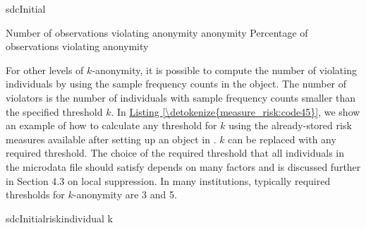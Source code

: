\documentclass[letterpaper,10pt,english]{sphinxmanual}
\begin{document}
\def\sphinxLiteralBlockLabel{\label{\detokenize{measure_risk:code44}}}
%
\begin{sphinxVerbatim}[commandchars=\\\{\},numbers=left,firstnumber=1,stepnumber=1]
 sdcInitial 

 Number of observations violating
   anonymity 
   anonymity 
 Percentage of observations violating
   anonymity  
\end{sphinxVerbatim}

For other levels of \(k\)-anonymity, it is possible to compute the
number of violating individuals by using the sample frequency counts in
the  object. The number of violators is the number of
individuals with sample frequency counts smaller than the specified
threshold \(k\). In \hyperref[\detokenize{measure_risk:code45}]{Listing \ref{\detokenize{measure_risk:code45}}}, we show an example of how to
calculate any threshold for \(k\) using the already-stored risk
measures available after setting up an  object in .
\(k\) can be replaced with any required threshold. The choice of the
required threshold that all individuals in the microdata file should
satisfy depends on many factors and is discussed further in Section 4.3
on local suppression. In many institutions, typically required
thresholds for \(k\)-anonymity are 3 and 5.

\def\sphinxLiteralBlockLabel{\label{\detokenize{measure_risk:code45}}}
%
\begin{sphinxVerbatim}[commandchars=\\\{\},numbers=left,firstnumber=1,stepnumber=1]
 sdcInitialriskindividual\PYG{p}{[}\PYG{p}{]}  k
\end{sphinxVerbatim}
\end{document}
